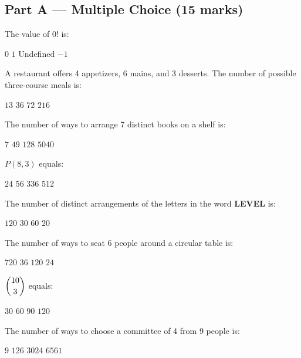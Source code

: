 \documentclass[addpoints]{exam}
\begin{document}
\newpage
\begin{questions}

\section*{Part A --- Multiple Choice (15 marks)}
\vspace{5mm}

\question[1] The value of $0!$ is:
\begin{choices}
    \choice $0$
    \correctchoice $1$
    \choice Undefined
    \choice $-1$
\end{choices}

\question[1] A restaurant offers 4 appetizers, 6 mains, and 3 desserts. The number of possible
three-course meals is:
\begin{choices}
    \choice $13$
    \choice $36$
    \correctchoice $72$
    \choice $216$
\end{choices}

\question[1] The number of ways to arrange 7 distinct books on a shelf is:
\begin{choices}
    \choice $7$
    \choice $49$
    \choice $128$
    \correctchoice $5040$
\end{choices}

\question[1] $P(8, 3)$ equals:
\begin{choices}
    \choice $24$
    \choice $56$
    \correctchoice $336$
    \choice $512$
\end{choices}

\question[1] The number of distinct arrangements of the letters in the word \textbf{LEVEL} is:
\begin{choices}
    \choice $120$
    \correctchoice $30$
    \choice $60$
    \choice $20$
\end{choices}

\question[1] The number of ways to seat 6 people around a circular table is:
\begin{choices}
    \choice $720$
    \choice $36$
    \correctchoice $120$
    \choice $24$
\end{choices}

\question[1] $\dbinom{10}{3}$ equals:
\begin{choices}
    \choice $30$
    \choice $60$
    \choice $90$
    \correctchoice $120$
\end{choices}

\question[1] The number of ways to choose a committee of 4 from 9 people is:
\begin{choices}
    \choice $9$
    \correctchoice $126$
    \choice $3024$
    \choice $6561$
\end{choices}


\end{questions}
\end{document}

